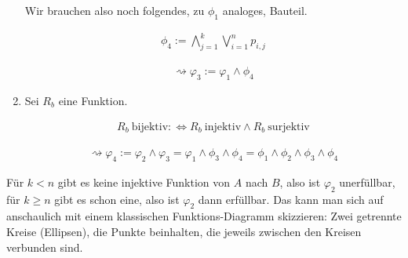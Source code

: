 \begin{solution}
\begin{enumerate}[label = \arabic*.]
  Wir brauchen also noch folgendes, zu $\phi_1$ analoges, Bauteil.

  \begin{align*}
    \phi_4
    :=
    \bigwedge_{j=1}^k \bigvee_{i=1}^np_{i,j}
  \end{align*}
  
  \begin{align*}
    \rightsquigarrow
    \varphi_3
    :=
    \varphi_1 \land \phi_4
  \end{align*}

  
  \item Sei $R_b$ eine Funktion.
  
  \begin{align*}
    R_b ~\text{bijektiv}
    :\iff
    R_b ~\text{injektiv}
    \land
    R_b ~\text{surjektiv}
  \end{align*}

  \begin{align*}
    \rightsquigarrow
    \varphi_4
    :=
    \varphi_2 \land \varphi_3
    =
    \varphi_1 \land \phi_3 \land \phi_4
    =
    \phi_1 \land \phi_2 \land \phi_3 \land \phi_4
  \end{align*}


\end{enumerate}

Für $k < n$ gibt es keine injektive Funktion von $A$ nach $B$, also ist $\varphi_2$ unerfüllbar, für $k \geq n$ gibt es schon eine, also ist $\varphi_2$ dann erfüllbar.
Das kann man sich auf anschaulich mit einem klassischen Funktions-Diagramm skizzieren:
Zwei getrennte Kreise (Ellipsen), die Punkte beinhalten, die jeweils zwischen den Kreisen verbunden sind.

\end{solution}

